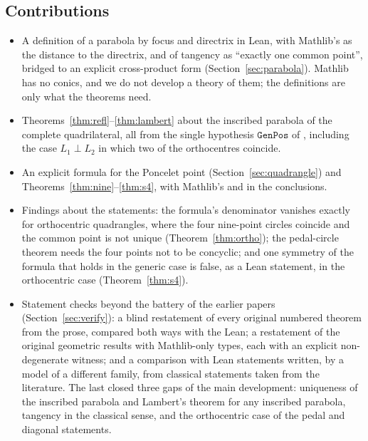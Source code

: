 \documentclass[11pt]{article}
\theoremstyle{definition}
\theoremstyle{remark}
\newcommand{\lean}[1]{\texttt{#1}}
\begin{document}
\subsection{Contributions}
\begin{itemize}
\item A definition of a parabola by focus and directrix in Lean, with Mathlib's
 as the distance to the directrix, and of tangency as ``exactly one common
point'', bridged to an explicit cross-product form (Section~\ref{sec:parabola}). Mathlib has no
conics, and we do not develop a theory of them; the definitions are only what the theorems need.
\item Theorems~\ref{thm:refl}--\ref{thm:lambert} about the inscribed parabola of the complete
quadrilateral, all from the single hypothesis $\lean{GenPos}$ of \cite{paperE}, including the
case $L_1\perp L_2$ in which two of the orthocentres coincide.
\item An explicit formula for the Poncelet point (Section~\ref{sec:quadrangle}) and
Theorems~\ref{thm:nine}--\ref{thm:s4}, with Mathlib's  and
 in the conclusions.
\item Findings about the statements: the formula's denominator vanishes exactly for orthocentric
quadrangles, where the four nine-point circles coincide and the common point is not unique
(Theorem~\ref{thm:ortho}); the pedal-circle theorem needs the four points not to be concyclic; and
one symmetry of the formula that holds in the generic case is false, as a Lean statement, in the
orthocentric case (Theorem~\ref{thm:s4}).
\item Statement checks beyond the battery of the earlier papers (Section~\ref{sec:verify}): a blind
restatement of every original numbered theorem from the prose, compared both ways with the Lean; a
restatement of the original geometric results with Mathlib-only types, each with an explicit
non-degenerate witness; and a comparison with
Lean statements written, by a model of a different family, from classical statements taken from the
literature. The last closed
three gaps of the main development: uniqueness of the inscribed parabola and Lambert's theorem for any
inscribed parabola, tangency in the classical sense, and the orthocentric case of the pedal and
diagonal statements.
\end{itemize}
\end{document}
